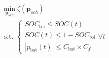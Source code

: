 \begin{equation}
\begin{split}
	&\min_{\textbf{p}_{sch}}\zeta(\textbf{p}_{sch}) \\
	&\text{ s.t. }
	\begin{cases}
		SOC_\text{tol} \leq SOC(t)\\
		SOC(t) \leq 1-SOC_\text{tol}\\
		|p_\text{bat}(t)| \leq C_\text{bat} \times C_{f}
	\end{cases}
	\forall t
\end{split}
\label{ch2:equ:cost-minimisation}
\end{equation}